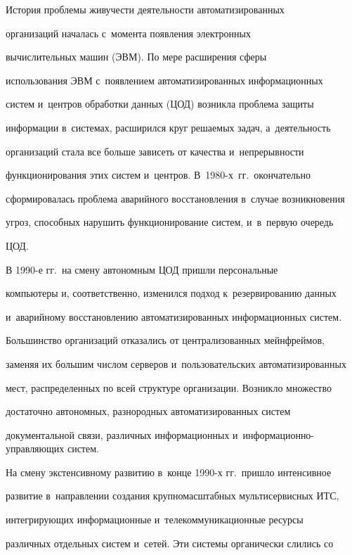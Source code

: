  


  История проблемы живучести деятельности автоматизированных 


организаций началась с~момента появления электронных


вычислительных машин (ЭВМ). По мере расширения сферы 


использования ЭВМ с~появлением автоматизированных информационных 


сис\-тем и~центров обработки данных (ЦОД) возникла проблема защиты 


информации в~сис\-те\-мах, расширился круг решаемых задач, а~деятельность 


организаций стала все больше зависеть от качества и~непрерывности 


функционирования этих сис\-тем и~центров. В~1980-х~гг.\ окончательно 


сформировалась проблема аварийного восстановления в~случае возникновения 


угроз, способных нарушить функционирование сис\-тем, и~в~первую очередь 


ЦОД.


  


  В 1990-е гг.\ на смену автономным ЦОД пришли персональные 


компьютеры и, соответственно, изменился подход к~резервированию данных 


и~аварийному восстановлению автоматизированных информационных сис\-тем. 


Большинство организаций отказались от централизованных мейнфреймов, 


заменяя их большим числом серверов и~пользовательских автоматизированных 


мест, распределенных по всей структуре организации. Возникло множество 


достаточно автономных, разнородных автоматизированных сис\-тем 


документальной связи, различных информационных и~ин\-фор\-ма\-ци\-он\-но-управ\-ля\-ющих сис\-тем.


  


  На смену экстенсивному развитию в~конце 1990-х гг.\ пришло интенсивное 


развитие в~направлении создания крупномасштабных мультисервисных ИТС, 


интегрирующих информационные и~телекоммуникационные ресурсы 


различных отдельных сис\-тем и~сетей. Эти сис\-те\-мы органически слились со 



